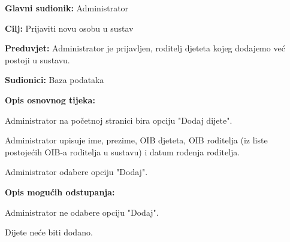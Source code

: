 					\noindent {}
					\begin{packed_item}
						
						\item \textbf{Glavni sudionik: }Administrator
						\item  \textbf{Cilj:} Prijaviti novu osobu u sustav
						\item  \textbf{Preduvjet:} Administrator je prijavljen, roditelj djeteta kojeg dodajemo već postoji u sustavu.
						\item  \textbf{Sudionici:} Baza podataka
						\item  \textbf{Opis osnovnog tijeka:}
						
						\item[] \begin{packed_enum}
							
							\item Administrator na početnoj stranici bira opciju "Dodaj dijete".
							\item Administrator upisuje ime, prezime, OIB djeteta, OIB roditelja (iz liste postojećih OIB-a roditelja u sustavu) i datum rođenja roditelja.
							\item Administrator odabere opciju "Dodaj".
						\end{packed_enum}
						
						\item  \textbf{Opis mogućih odstupanja:}
						
						\item[] \begin{packed_item}
							
							
							\item[3.a] Administrator ne odabere opciju "Dodaj".
							\item[] \begin{packed_enum}
								
								\item Dijete neće biti dodano.
							\end{packed_enum}
							
							
						\end{packed_item}
						
						
					\end{packed_item}
					
